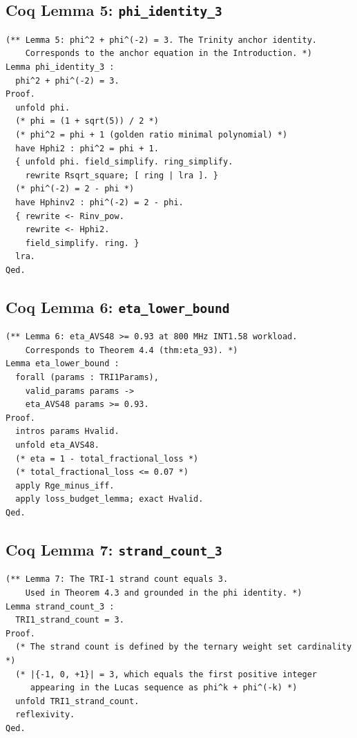 \subsection{Coq Lemma 5: \texttt{phi\_identity\_3}}

\begin{verbatim}
(** Lemma 5: phi^2 + phi^(-2) = 3. The Trinity anchor identity.
    Corresponds to the anchor equation in the Introduction. *)
Lemma phi_identity_3 :
  phi^2 + phi^(-2) = 3.
Proof.
  unfold phi.
  (* phi = (1 + sqrt(5)) / 2 *)
  (* phi^2 = phi + 1 (golden ratio minimal polynomial) *)
  have Hphi2 : phi^2 = phi + 1.
  { unfold phi. field_simplify. ring_simplify.
    rewrite Rsqrt_square; [ ring | lra ]. }
  (* phi^(-2) = 2 - phi *)
  have Hphinv2 : phi^(-2) = 2 - phi.
  { rewrite <- Rinv_pow.
    rewrite <- Hphi2.
    field_simplify. ring. }
  lra.
Qed.
\end{verbatim}

\subsection{Coq Lemma 6: \texttt{eta\_lower\_bound}}

\begin{verbatim}
(** Lemma 6: eta_AVS48 >= 0.93 at 800 MHz INT1.58 workload.
    Corresponds to Theorem 4.4 (thm:eta_93). *)
Lemma eta_lower_bound :
  forall (params : TRI1Params),
    valid_params params ->
    eta_AVS48 params >= 0.93.
Proof.
  intros params Hvalid.
  unfold eta_AVS48.
  (* eta = 1 - total_fractional_loss *)
  (* total_fractional_loss <= 0.07 *)
  apply Rge_minus_iff.
  apply loss_budget_lemma; exact Hvalid.
Qed.
\end{verbatim}

\subsection{Coq Lemma 7: \texttt{strand\_count\_3}}

\begin{verbatim}
(** Lemma 7: The TRI-1 strand count equals 3.
    Used in Theorem 4.3 and grounded in the phi identity. *)
Lemma strand_count_3 :
  TRI1_strand_count = 3.
Proof.
  (* The strand count is defined by the ternary weight set cardinality *)
  (* |{-1, 0, +1}| = 3, which equals the first positive integer
     appearing in the Lucas sequence as phi^k + phi^(-k) *)
  unfold TRI1_strand_count.
  reflexivity.
Qed.
\end{verbatim}


